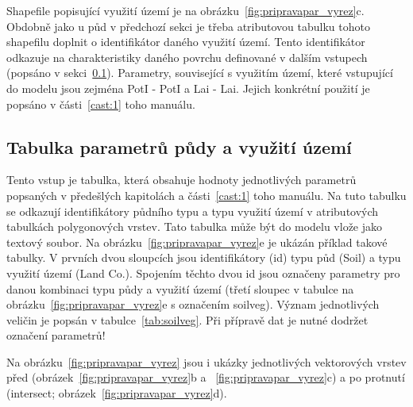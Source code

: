 Shapefile popisující využití území je na obrázku~\ref{fig:pripravapar_vyrez}c. Obdobně jako u půd v předchozí sekci je třeba atributovou tabulku tohoto shapefilu doplnit o identifikátor daného využití území. Tento identifikátor odkazuje na charakteristiky daného povrchu definované v dalším vstupech (popsáno v sekci~\ref{sec:upravatabulkyparametru}). Parametry, související s využitím území, které vstupující do modelu jsou zejména \acs{PotI} - \acl{PotI} a \acs{Lai} - \acl{Lai}. Jejich konkrétní použití je popsáno v části~\ref{cast:1} toho manuálu. 
% 
% 
% 
% 







\subsection{Tabulka parametrů půdy a využití území}  \label{sec:upravatabulkyparametru}

Tento vstup je tabulka, která obsahuje hodnoty jednotlivých parametrů popsaných v předešlých kapitolách a části~\ref{cast:1} toho manuálu. Na tuto tabulku se odkazují identifikátory půdního typu a typu využití území v atributových tabulkách polygonových vrstev. Tato tabulka může být do modelu vlože jako textový soubor. Na obrázku~\ref{fig:pripravapar_vyrez}e je ukázán příklad takové tabulky. V prvních dvou sloupcích jsou identifikátory (id) typu půd (Soil) a typu využití území (Land Co.). Spojením těchto dvou id jsou označeny parametry pro danou kombinaci typu půdy a využití území (třetí sloupec v tabulce na obrázku~\ref{fig:pripravapar_vyrez}e s označením soilveg). Význam jednotlivých veličin je popsán v tabulce~\ref{tab:soilveg}. Při přípravě dat je nutné dodržet označení parametrů!

Na obrázku~\ref{fig:pripravapar_vyrez} jsou i ukázky jednotlivých vektorových vrstev před (obrázek~\ref{fig:pripravapar_vyrez}b a ~\ref{fig:pripravapar_vyrez}c) a po protnutí (intersect; obrázek~\ref{fig:pripravapar_vyrez}d). 

